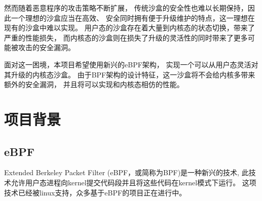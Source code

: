 \documentclass[AutoFakeBold,a4paper]{ctexart}
\begin{document}
然而随着恶意程序的攻击策略不断扩展，
传统沙盒的安全性也难以长期保持，因此一个理想的沙盒应当在高效、
安全同时拥有便于升级维护的特点，这一理想在现有的沙盒中难以实现。
用户态的沙盒存在着大量到内核态的状态切换，带来了严重的性能损失，
而内核态的沙盒则在损失了升级的灵活性的同时带来了更多可能被攻击的安全漏洞。

面对这一困境，本项目希望使用新兴的eBPF架构，
实现一个可以从用户态灵活对其升级的内核态沙盒。
由于BPF架构的设计特征，这一沙盒将不会给内核多带来额外的安全漏洞，
并且将可以实现和内核态相仿的性能。

\section{项目背景}


\subsection{eBPF}
    Extended Berkeley Packet Filter (eBPF，或简称为BPF)是一种新兴的技术,
    此技术允许用户态进程向kernel提交代码段并且将这些代码在kernel模式下运行。
    这项技术已经被linux支持，众多基于eBPF的项目正在进行中。
\end{document}
